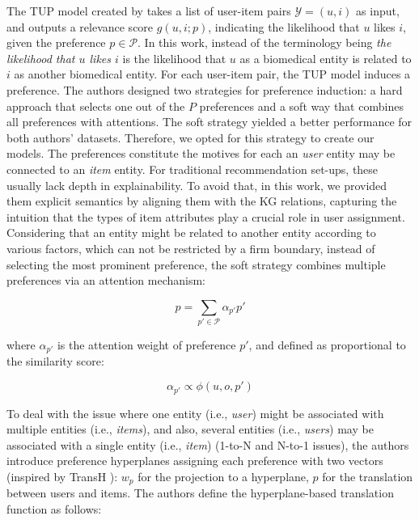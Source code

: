 The TUP model created by \cite{10.1145/3308558.3313705} takes a list of user-item pairs $\mathcal{Y} = {(u, i)}$ as input, and outputs a relevance score $g(u, i; p)$, indicating the likelihood that $u$ likes $i$, given the preference $p \in \mathcal{P}$. In this work, instead of the terminology being \textit{the likelihood that $u$ likes $i$} is the likelihood that $u$ as a biomedical entity is related to $i$ as another biomedical entity. 
For each user-item pair, the TUP model induces a preference. The authors designed two strategies for preference induction: a hard approach that selects one out of the $P$ preferences and a soft way that combines all preferences with attentions. The soft strategy yielded a better performance for both authors' datasets. Therefore, we opted for this strategy to create our models. The preferences constitute the motives for each an \textit{user} entity may be connected to an \textit{item} entity. For traditional recommendation set-ups, these usually lack depth in explainability. To avoid that, in this work, we provided them explicit semantics by aligning them with the KG relations, capturing the intuition that the types of item attributes play a crucial role in user assignment. Considering that an entity might be related to another entity according to various factors, which can not be restricted by a firm boundary, instead of selecting the most prominent preference, the soft strategy combines multiple preferences via an attention mechanism:

\begin{equation}
p = \sum_{p' \in \mathcal{P}} \alpha_{p'} p'
\label{equation:soft}
\end{equation}

where $\alpha_{p'}$ is the attention weight of preference $p'$, and defined as proportional to the similarity score:

\begin{equation}
\alpha_{p'} \propto \phi(u, o, p')
\label{equation:similarity}
\end{equation}

To deal with the issue where one entity (i.e., \textit{user}) might be associated with multiple entities (i.e., \textit{items}), and also, several entities (i.e., \textit{users}) may be associated with a single entity (i.e., \textit{item}) (1-to-N and N-to-1 issues), the authors introduce preference hyperplanes assigning each preference with two vectors (inspired by TransH \citep{10.5555/2893873.2894046}): $w_p$ for the projection to a hyperplane, $p$ for the translation between users and items. The authors define the hyperplane-based translation function as follows:

